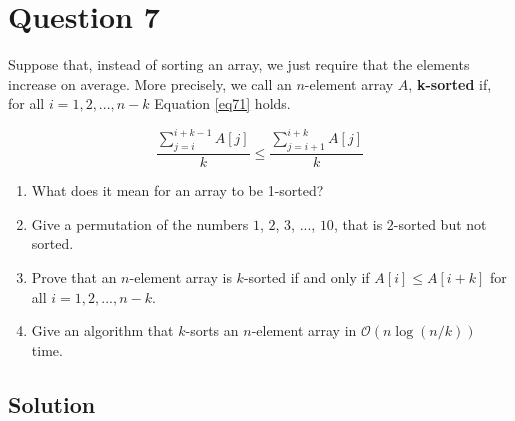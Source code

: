 
\section*{Question 7}

Suppose that, instead of sorting an array, we just require that the elements increase on average. More precisely, we call an $n$-element array $A$, \textbf{k-sorted} if, for all $i = 1, 2, ..., n-k$ Equation \ref{eq71} holds.

\begin{equation}\label{eq71}
\frac{\sum_{j=i}^{i + k - 1} A[j]}{k} \leq \frac{\sum_{j=i+1}^{i + k} A[j]}{k}
\end{equation}

\begin{enumerate}[label=(\alph*)]
\item What does it mean for an array to be 1-sorted?
\item Give a permutation of the numbers $1$, $2$, $3$, ..., $10$, that is $2$-sorted but not sorted.
\item Prove that an $n$-element array is $k$-sorted if and only if $A[i] \leq A[i+k]$ for all $i = 1, 2, ..., n-k$.
\item Give an algorithm that $k$-sorts an $n$-element array in $\mathcal{O}(n \log (n/k))$ time.
\end{enumerate}

\subsection*{Solution}


